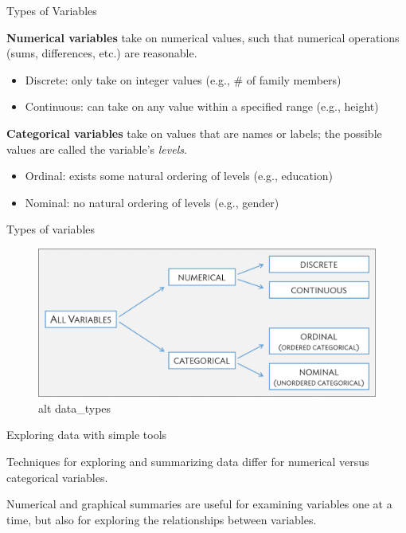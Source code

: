 \documentclass[
  ignorenonframetext,
]{beamer}
\providecommand{\tightlist}{%
  \setlength{\itemsep}{0pt}\setlength{\parskip}{0pt}}
\begin{document}
\begin{frame}{Types of Variables}
\protect\hypertarget{types-of-variables}{}

\textbf{Numerical variables} take on numerical values, such that
numerical operations (sums, differences, etc.) are reasonable.

\begin{itemize}
\item
  Discrete: only take on integer values (e.g., \# of family members)
\item
  Continuous: can take on any value within a specified range (e.g.,
  height)
\end{itemize}

\textbf{Categorical variables} take on values that are names or labels;
the possible values are called the variable's \emph{levels}.

\begin{itemize}
\tightlist
\item
  Ordinal: exists some natural ordering of levels (e.g., education)
\item
  Nominal: no natural ordering of levels (e.g., gender)
\end{itemize}

\end{frame}

\begin{frame}{Types of variables}
\protect\hypertarget{types-of-variables-1}{}

\begin{figure}
\centering
\includegraphics{figures/variableTypes.png}
\caption{alt data\_types}
\end{figure}

\end{frame}

\begin{frame}{Exploring data with simple tools}
\protect\hypertarget{exploring-data-with-simple-tools}{}

Techniques for exploring and summarizing data differ for numerical
versus categorical variables.

Numerical and graphical summaries are useful for examining variables one
at a time, but also for exploring the relationships between variables.

\end{frame}
\end{document}
